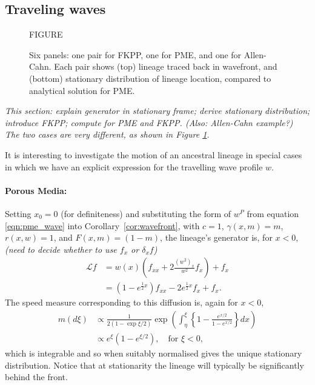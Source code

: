 \documentclass[12pt]{article}
\newcommand{\Lgen}{\mathcal{L}}    %
\newcommand{\comment}[1]{{\color{blue} \it #1}}
\begin{document}
\subsection{Traveling waves}

\begin{figure}
    \begin{center}
        FIGURE
    \end{center}
    \caption{
        Six panels: one pair for FKPP, one for PME, and one for Allen-Cahn.
        Each pair shows (top) lineage traced back in wavefront,
        and (bottom) stationary distribution of lineage location,
        compared to analytical solution for PME.
        \label{fig:pme_vs_fkpp}
    }
\end{figure}

\comment{
    This section:
    explain generator in stationary frame;
    derive stationary distribution;
    introduce FKPP;
    compute for PME and FKPP.
    (Also: Allen-Cahn example?)
    The two cases are very different, as shown in Figure \ref{fig:pme_vs_fkpp}.
}

It is interesting to investigate the motion of an ancestral lineage
in special cases in which we have an explicit expression for the travelling
wave profile $w$. 

\paragraph{Porous Media:}
Setting $x_0=0$ (for definiteness) and substituting
the form of $w^P$ from equation \eqref{eqn:pme_wave}
into Corollary~\ref{cor:wavefront},
with $c=1$,
$\gamma(x, m) = m$,
$r(x,w) = 1$,
and $F(x, m) = (1 - m)$,
the lineage's generator is, for $x < 0$,
\comment{(need to decide whether to use $f_x$ or $\delta_x f$)}
\begin{align*}
    \Lgen f
    &=
        w(x)
        \left(
         f_{xx}
         +
         2 \frac{(w^2)_x}{w^2} f_x
        \right)
        + f_x \\
    &=
        \left(1 - e^{\frac{1}{2} x} \right)
        f_{xx}
        -
        2 e^{\frac{1}{2} x} f_x
        +
        f_x .
\end{align*}
The speed measure corresponding to this diffusion is,
again for $x < 0$,
\begin{align*}
    m(d\xi)
    &\propto
        \frac{ 1 }{ 2 (1 - \exp{\xi/2}) }
        \exp\left(
            \int_\eta^\xi \left\{
                1 - \frac{e^{x/2}}{1 - e^{x/2}}
            \right\} dx
        \right) \\
    &\propto
        e^\xi\left(1-e^{\xi/2}\right),
        \quad
        \text{for } \xi < 0 ,
\end{align*}
which is integrable and so when suitably normalised gives the unique stationary distribution.
Notice that at stationarity
the lineage will typically be significantly behind the front. 
\end{document}
